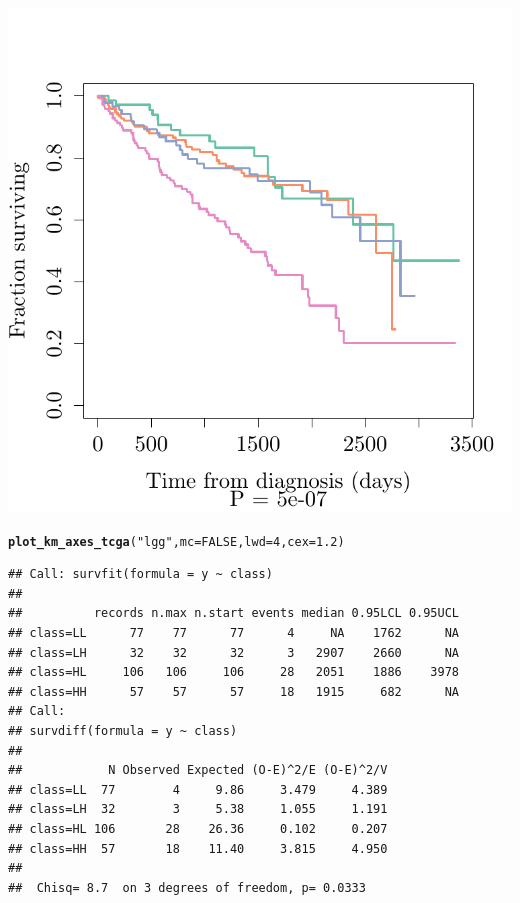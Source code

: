 \documentclass{article}\usepackage[]{graphicx}\usepackage[]{color}
\makeatletter
\def\maxwidth{ %
  \ifdim\Gin@nat@width>\linewidth
    \linewidth
  \else
    \Gin@nat@width
  \fi
}
\newcommand{\hlnum}[1]{\textcolor[rgb]{0.686,0.059,0.569}{#1}}%
\newcommand{\hlstr}[1]{\textcolor[rgb]{0.192,0.494,0.8}{#1}}%
\newcommand{\hlstd}[1]{\textcolor[rgb]{0.345,0.345,0.345}{#1}}%
\newcommand{\hlkwc}[1]{\textcolor[rgb]{0.333,0.667,0.333}{#1}}%
\newcommand{\hlkwd}[1]{\textcolor[rgb]{0.737,0.353,0.396}{\textbf{#1}}}%
\newenvironment{kframe}{%
 \def\at@end@of@kframe{}%
 \ifinner\ifhmode%
  \def\at@end@of@kframe{\end{minipage}}%
  \begin{minipage}{\columnwidth}%
 \fi\fi%
 \def\FrameCommand##1{\hskip\@totalleftmargin \hskip-\fboxsep
 \colorbox{shadecolor}{##1}\hskip-\fboxsep
     \hskip-\linewidth \hskip-\@totalleftmargin \hskip\columnwidth}%
 \MakeFramed {\advance\hsize-\width
   \@totalleftmargin\z@ \linewidth\hsize
   \@setminipage}}%
 {\par\unskip\endMakeFramed%
 \at@end@of@kframe}
\newenvironment{knitrout}{}{} %
\makeatother
\begin{document}
\begin{knitrout}
{}




{\centering \includegraphics[width=\maxwidth]{figure/km-curves-10} 

}


\begin{kframe}\begin{alltt}
\hlkwd{plot_km_axes_tcga}\hlstd{(}\hlstr{"lgg"}\hlstd{,} \hlkwc{mc} \hlstd{=} \hlnum{FALSE}\hlstd{,} \hlkwc{lwd} \hlstd{=} \hlnum{4}\hlstd{,} \hlkwc{cex} \hlstd{=} \hlnum{1.2}\hlstd{)}
\end{alltt}


{\ttfamily\noindent{}}\begin{verbatim}
## Call: survfit(formula = y ~ class)
## 
##          records n.max n.start events median 0.95LCL 0.95UCL
## class=LL      77    77      77      4     NA    1762      NA
## class=LH      32    32      32      3   2907    2660      NA
## class=HL     106   106     106     28   2051    1886    3978
## class=HH      57    57      57     18   1915     682      NA
## Call:
## survdiff(formula = y ~ class)
## 
##            N Observed Expected (O-E)^2/E (O-E)^2/V
## class=LL  77        4     9.86     3.479     4.389
## class=LH  32        3     5.38     1.055     1.191
## class=HL 106       28    26.36     0.102     0.207
## class=HH  57       18    11.40     3.815     4.950
## 
##  Chisq= 8.7  on 3 degrees of freedom, p= 0.0333
\end{verbatim}
\end{kframe}


\end{knitrout}
\end{document}
